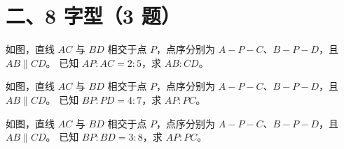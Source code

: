 \documentclass{exam-zh}
\begin{document}
\clearpage
\section*{二、8 字型（3 题）}


\begin{problem}[points=10]
  \noindent
  \begin{minipage}[t]{\dimexpr\linewidth-60mm-6mm\relax}
    \vspace{0pt}
    如图，直线 $AC$ 与 $BD$ 相交于点 $P$，点序分别为 $A-P-C$、$B-P-D$，且 $AB\parallel CD$。
已知 $AP:AC=2:5$，求 $AB:CD$。


  \end{minipage}\hfill
  \begin{diagramcoltikz}{60mm}{第 4 题图}
  }
  \end{diagramcoltikz}
  \par\medskip
  \answerarea[38mm]
\end{problem}



\begin{problem}[points=10]
  \noindent
  \begin{minipage}[t]{\dimexpr\linewidth-60mm-6mm\relax}
    \vspace{0pt}
    如图，直线 $AC$ 与 $BD$ 相交于点 $P$，点序分别为 $A-P-C$、$B-P-D$，且 $AB\parallel CD$。
已知 $BP:PD=4:7$，求 $AP:PC$。


  \end{minipage}\hfill
  \begin{diagramcoltikz}{60mm}{第 5 题图}
  }
  \end{diagramcoltikz}
  \par\medskip
  \answerarea[38mm]
\end{problem}



\begin{problem}[points=10]
    如图，直线 $AC$ 与 $BD$ 相交于点 $P$，点序分别为 $A-P-C$、$B-P-D$，且 $AB\parallel CD$。
已知 $BP:BD=3:8$，求 $AP:PC$。


  \answerarea[38mm]
\end{problem}
\end{document}

